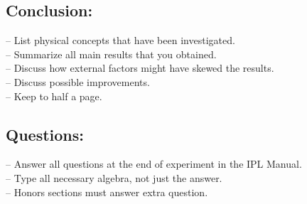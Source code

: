 \documentclass[12pt]{article}
\begin{document}
	\subsection*{Conclusion:}
		– List physical concepts that have been investigated.\\
		– Summarize all main results that you obtained.\\
		– Discuss how external factors might have skewed the results.\\
		– Discuss possible improvements.\\
		– Keep to half a page.\\
	\subsection*{Questions:}
		– Answer all questions at the end of experiment in the IPL Manual.\\
		– Type all necessary algebra, not just the answer.\\
		– Honors sections must answer extra question.
\end{document}
